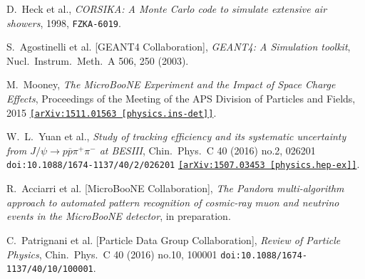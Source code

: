 \documentclass[a4paper,11pt]{article}
\begin{document}
\begin{thebibliography}{99}
   D.~Heck et al.,
  \textit{CORSIKA: A Monte Carlo code to simulate extensive air showers}, 1998,
  \texttt{FZKA-6019}.

   S.~Agostinelli et al. [GEANT4 Collaboration], \textit{GEANT4: A Simulation toolkit}, Nucl.\ Instrum.\ Meth.\ A {506}, 250 (2003).

   M.~Mooney, \textit{The MicroBooNE Experiment and the Impact of Space Charge Effects}, Proceedings of the Meeting of the APS Division of Particles and Fields, 2015 \texttt{\href{https://arxiv.org/abs/1511.01563}{[arXiv:1511.01563 [physics.ins-det]]}}.

   W.~L.~Yuan et al., \textit{Study of tracking efficiency and its systematic uncertainty from $J/\psi \to p \overline{p} \pi^+ \pi^-$ at BESIII}, Chin.\ Phys.\ C 40 (2016) no.2,  026201 \texttt{doi:10.1088/1674-1137/40/2/026201}  \texttt{\href{https://arxiv.org/abs/1506.05348}{[arXiv:1507.03453 [physics.hep-ex]]}}.

   R.~Acciarri et al. [MicroBooNE Collaboration], \textit{The Pandora multi-algorithm approach to automated pattern recognition of cosmic-ray muon and neutrino events in the MicroBooNE detector}, in preparation.

   C.~Patrignani et al. [Particle Data Group Collaboration], \textit{Review of Particle Physics}, Chin.\ Phys.\ C 40 (2016) no.10,  100001 \texttt{doi:10.1088/1674-1137/40/10/100001}.





\end{thebibliography}
\end{document}
